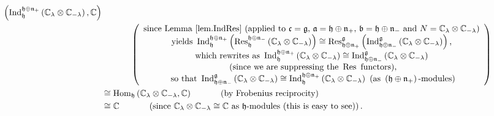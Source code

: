 \documentclass
[numbers=enddot,12pt,final,onecolumn,german,notitlepage]{scrartcl}%
\theoremstyle{definition}
\begin{document}
\begin{align*}
{}\left(  \operatorname*{Ind}\nolimits_{\mathfrak{h}}^{\mathfrak{h}%
\oplus\mathfrak{n}_{+}}\left(  \mathbb{C}_{\lambda}\otimes\mathbb{C}%
_{-\lambda}\right)  ,\mathbb{C}\right) \\
&  \ \ \ \ \ \ \ \ \ \ \left(
\begin{array}
[c]{c}%
\text{since Lemma \ref{lem.IndRes} (applied to }\mathfrak{c}=\mathfrak{g}%
\text{, }\mathfrak{a}=\mathfrak{h}\oplus\mathfrak{n}_{+}\text{, }%
\mathfrak{b}=\mathfrak{h}\oplus\mathfrak{n}_{-}\text{ and }N=\mathbb{C}%
_{\lambda}\otimes\mathbb{C}_{-\lambda}\text{)}\\
\text{yields }\operatorname*{Ind}\nolimits_{\mathfrak{h}}^{\mathfrak{h}%
\oplus\mathfrak{n}_{+}}\left(  \operatorname*{Res}\nolimits_{\mathfrak{h}%
}^{\mathfrak{h}\oplus\mathfrak{n}_{-}}\left(  \mathbb{C}_{\lambda}%
\otimes\mathbb{C}_{-\lambda}\right)  \right)  \cong\operatorname*{Res}%
\nolimits_{\mathfrak{h}\oplus\mathfrak{n}_{+}}^{\mathfrak{g}}\left(
\operatorname*{Ind}\nolimits_{\mathfrak{h}\oplus\mathfrak{n}_{-}%
}^{\mathfrak{g}}\left(  \mathbb{C}_{\lambda}\otimes\mathbb{C}_{-\lambda
}\right)  \right)  \text{,}\\
\text{which rewrites as }\operatorname*{Ind}\nolimits_{\mathfrak{h}%
}^{\mathfrak{h}\oplus\mathfrak{n}_{+}}\left(  \mathbb{C}_{\lambda}%
\otimes\mathbb{C}_{-\lambda}\right)  \cong\operatorname*{Ind}%
\nolimits_{\mathfrak{h}\oplus\mathfrak{n}_{-}}^{\mathfrak{g}}\left(
\mathbb{C}_{\lambda}\otimes\mathbb{C}_{-\lambda}\right) \\
\text{ (since we are suppressing the }\operatorname*{Res}\text{ functors),}\\
\text{ so that }\operatorname*{Ind}\nolimits_{\mathfrak{h}\oplus
\mathfrak{n}_{-}}^{\mathfrak{g}}\left(  \mathbb{C}_{\lambda}\otimes
\mathbb{C}_{-\lambda}\right)  \cong\operatorname*{Ind}\nolimits_{\mathfrak{h}%
}^{\mathfrak{h}\oplus\mathfrak{n}_{+}}\left(  \mathbb{C}_{\lambda}%
\otimes\mathbb{C}_{-\lambda}\right)  \text{ (as }\left(  \mathfrak{h}%
\oplus\mathfrak{n}_{+}\right)  \text{-modules)}%
\end{array}
\right) \\
&  \cong\operatorname*{Hom}\nolimits_{\mathfrak{h}}\left(  \mathbb{C}%
_{\lambda}\otimes\mathbb{C}_{-\lambda},\mathbb{C}\right)
\ \ \ \ \ \ \ \ \ \ \left(  \text{by Frobenius reciprocity}\right) \\
&  \cong\mathbb{C}\ \ \ \ \ \ \ \ \ \ \left(  \text{since }\mathbb{C}%
_{\lambda}\otimes\mathbb{C}_{-\lambda}\cong\mathbb{C}\text{ as }%
\mathfrak{h}\text{-modules (this is easy to see)}\right)  .
\end{align*}
\end{document}
